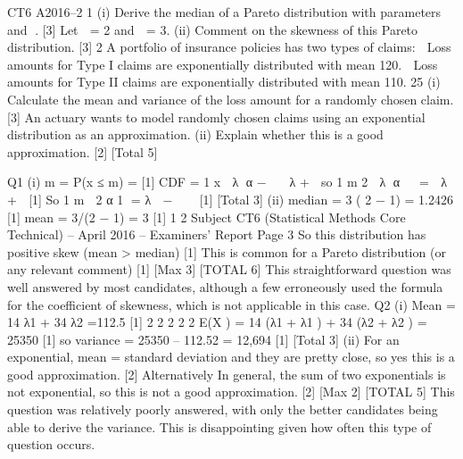 \documentclass[a4paper,12pt]{article}
\begin{document}
CT6 A2016–2
1 (i) Derive the median of a Pareto distribution with parameters  and . [3]
Let  = 2 and  = 3.
(ii) Comment on the skewness of this Pareto distribution. [3]
  2 A portfolio of insurance policies has two types of claims:
   Loss amounts for Type I claims are exponentially distributed with mean 120.
 Loss amounts for Type II claims are exponentially distributed with mean 110.
25%
(i) Calculate the mean and variance of the loss amount for a randomly chosen claim. [3]
An actuary wants to model randomly chosen claims using an exponential distribution as an approximation.
(ii) Explain whether this is a good approximation. [2]
[Total 5]

  Q1 (i) m = P(x ≤ m) =
  [1]
CDF = 1
x
 λ α −   λ + 
so 1
m 2
 λ α   =  λ + 
[1]
So
1
m  2 α 1 = λ  − 
 
[1]
[Total 3]
(ii) median = 3 ( 2 − 1) = 1.2426 [1]
mean = 3/(2 − 1) = 3 [1]
1
2
Subject CT6 (Statistical Methods Core Technical) – April 2016 – Examiners’ Report
Page 3
So this distribution has positive skew (mean > median) [1]
This is common for a Pareto distribution (or any relevant comment) [1]
[Max 3]
[TOTAL 6]
This straightforward question was well answered by most candidates, although a few erroneously used the formula for the coefficient of skewness, which is not applicable in this case.
Q2 (i) Mean = 14 λ1 + 34 λ2 =112.5 [1]
2 2 2 2 2
E(X ) = 14 (λ1 + λ1 ) + 34 (λ2 + λ2 ) = 25350 [1]
so variance = 25350 – 112.52 = 12,694 [1]
[Total 3]
(ii) For an exponential, mean = standard deviation and they are pretty close, so yes
this is a good approximation. [2]
Alternatively
In general, the sum of two exponentials is not exponential, so this is not a
good approximation. [2]
[Max 2]
[TOTAL 5]
This question was relatively poorly answered, with only the better candidates
being able to derive the variance. This is disappointing given how often this
type of question occurs.
\end{document}
